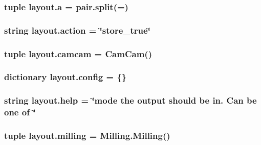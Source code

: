 \subsubsection[{a}]{\setlength{\rightskip}{0pt plus 5cm}tuple layout.\+a = pair.\+split(\textquotesingle{}=\textquotesingle{})}\label{namespacelayout_a748292864d9c627e94e6b6cc41304291}
\hypertarget{namespacelayout_aa92f20c6edf696c44f7073122603ad4d}{}
\subsubsection[{action}]{\setlength{\rightskip}{0pt plus 5cm}string layout.\+action = \char`\"{}store\+\_\+true\char`\"{}}\label{namespacelayout_aa92f20c6edf696c44f7073122603ad4d}
\hypertarget{namespacelayout_a4efd63b3001435f3c27da5cdd394c4cc}{}
\subsubsection[{camcam}]{\setlength{\rightskip}{0pt plus 5cm}tuple layout.\+camcam = {\bf Cam\+Cam}()}\label{namespacelayout_a4efd63b3001435f3c27da5cdd394c4cc}
\hypertarget{namespacelayout_addf4c4f1e95013fa5057f1d16a235035}{}
\subsubsection[{config}]{\setlength{\rightskip}{0pt plus 5cm}dictionary layout.\+config = \{\}}\label{namespacelayout_addf4c4f1e95013fa5057f1d16a235035}
\hypertarget{namespacelayout_aa8bcd46c44222a15f73de3e096725e5e}{}
\subsubsection[{help}]{\setlength{\rightskip}{0pt plus 5cm}string layout.\+help = \char`\"{}mode the output should be in. Can be one of \char`\"{}}\label{namespacelayout_aa8bcd46c44222a15f73de3e096725e5e}
\hypertarget{namespacelayout_a917f5d5f3feb2ac6efb7e20bdae63d72}{}
\subsubsection[{milling}]{\setlength{\rightskip}{0pt plus 5cm}tuple layout.\+milling = {\bf Milling.\+Milling}()}\label{namespacelayout_a917f5d5f3feb2ac6efb7e20bdae63d72}
\hypertarget{namespacelayout_a47fd03efd473398dfb10a65fc64eafe4}{}
